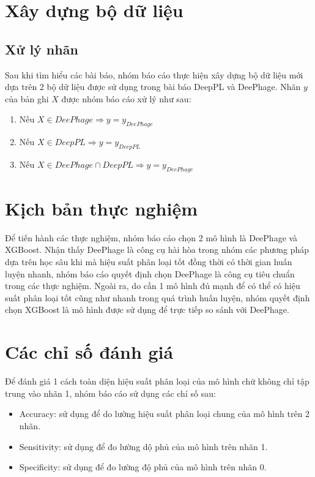 \section{Xây dựng bộ dữ liệu}
\subsection{ Xử lý nhãn }
Sau khi tìm hiểu các bài báo, nhóm báo cáo thực hiện xây dựng bộ dữ liệu mới dựa trên 2 bộ dữ liệu được sử dụng trong bài báo DeepPL và DeePhage. Nhãn $y$ của bản ghi $X$ được nhóm báo cáo xử lý như sau:
\begin{enumerate}
    \item Nếu $X \in DeePhage \Rightarrow y = y_{DeePhage}$ 
    \item Nếu $X \in DeepPL \Rightarrow y = y_{DeepPL}$
    \item Nếu $X \in DeePhage \cap DeepPL \Rightarrow y = y_{DeePhage}$
\end{enumerate}

\section{Kịch bản thực nghiệm}\label{ kịch bản thực nghiệm}
Để tiến hành các thực nghiệm, nhóm báo cáo chọn 2 mô hình là DeePhage và XGBoost. Nhận thấy DeePhage là công cụ  hài hòa trong nhóm các phương pháp dựa trên học sâu khi mà hiệu suất phân loại tốt đồng thời có thời gian huấn luyện nhanh, nhóm báo cáo quyết định chọn DeePhage là công cụ tiêu chuẩn trong các thực nghiệm. Ngoài ra, do cần 1 mô hình đủ mạnh để có thể có hiệu suất phân loại tốt cũng như nhanh trong quá trình huấn luyện, nhóm quyết định chọn XGBoost là mô hình được sử dụng để trực tiếp so sánh với DeePhage.

\section{Các chỉ số đánh giá}
Để đánh giá 1 cách toàn diện hiệu suất phân loại của mô hình chứ không chỉ tập trung vào nhãn 1, nhóm báo cáo sử dụng các chỉ số sau:
\begin{itemize}
    \item Accuracy: sử dụng để do lường hiệu suất phân loại chung của mô hình trên 2 nhãn.
    \item Sensitivity: sử dụng để đo lường dộ phủ của mô hình trên nhãn 1.
    \item Specificity: sử dụng để đo lường độ phủ của mô hình trên nhãn 0.
\end{itemize}

